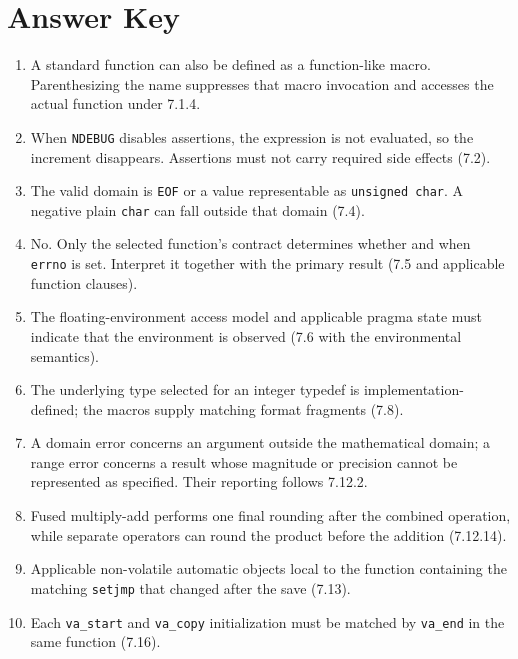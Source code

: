 \documentclass[10pt,letterpaper]{article}
\begin{document}
\clearpage
\section{Answer Key}
\begin{enumerate}
  \item A standard function can also be defined as a function-like macro. Parenthesizing the name suppresses that macro invocation and accesses the actual function under 7.1.4.

  \item When \texttt{NDEBUG} disables assertions, the expression is not evaluated, so the increment disappears. Assertions must not carry required side effects (7.2).

  \item The valid domain is \texttt{EOF} or a value representable as \texttt{unsigned char}. A negative plain \texttt{char} can fall outside that domain (7.4).

  \item No. Only the selected function's contract determines whether and when \texttt{errno} is set. Interpret it together with the primary result (7.5 and applicable function clauses).

  \item The floating-environment access model and applicable pragma state must indicate that the environment is observed (7.6 with the environmental semantics).

  \item The underlying type selected for an integer typedef is implementation-defined; the macros supply matching format fragments (7.8).

  \item A domain error concerns an argument outside the mathematical domain; a range error concerns a result whose magnitude or precision cannot be represented as specified. Their reporting follows 7.12.2.

  \item Fused multiply-add performs one final rounding after the combined operation, while separate operators can round the product before the addition (7.12.14).

  \item Applicable non-volatile automatic objects local to the function containing the matching \texttt{setjmp} that changed after the save (7.13).

  \item Each \texttt{va\_start} and \texttt{va\_copy} initialization must be matched by \texttt{va\_end} in the same function (7.16).


\end{enumerate}
\end{document}
